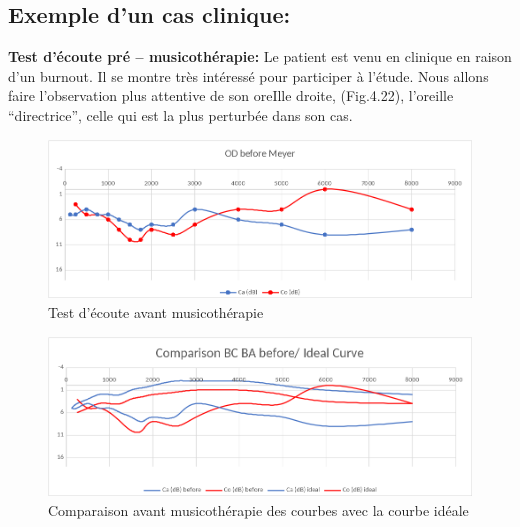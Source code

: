\subsection{Exemple d'un cas clinique:}


\textbf{ Test d'écoute pré -- musicothérapie:}
 	Le patient est venu en clinique en raison d'un burnout. Il se montre très
        intéressé pour participer à l'étude. Nous allons faire
        l'observation plus attentive de 
        son oreIlle droite, (Fig.4.22), l'oreille ``directrice'',
        celle qui est la plus perturbée dans son cas.
 
 	
 	\begin{figure}[tbh]
 		\centering
 		\includegraphics[width=0.7\linewidth]{images/clinique/od_before_meyer.png}
 		\caption{Test d'écoute avant musicothérapie}
 		\label{fig:odbeforemeyer}
 	\end{figure}
 	

	
 	\begin{figure}
 		\centering
 		\includegraphics[width=0.7\linewidth]{images/clinique/comparison_bc_ba_before_vs_ideal_curve_meyer.png}
 		\caption[Comparaison avec la courbe idéale]{Comparaison avant
                  musicothérapie des
                  courbes  avec la courbe idéale}
 		\label{fig:comparisonbcbabeforevsidealcurvemeyer}
 	\end{figure}


	
 	
